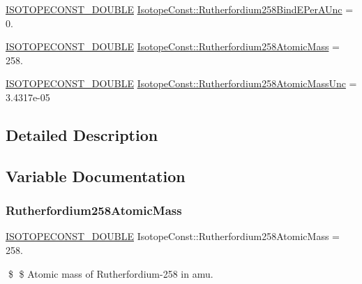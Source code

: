 \begin{DoxyCompactItemize}
\item 
\mbox{\hyperlink{group___isotope_const-_macros_ga8f45a7272ce02c0b4c65c44636ed719a}{I\+S\+O\+T\+O\+P\+E\+C\+O\+N\+S\+T\+\_\+\+D\+O\+U\+B\+LE}} \mbox{\hyperlink{group___isotope_const-_rutherfordium-_rf258_gafa8544391fc252509c95faf8fa7879a5}{Isotope\+Const\+::\+Rutherfordium258\+Bind\+E\+Per\+A\+Unc}} = 0.
\item 
\mbox{\hyperlink{group___isotope_const-_macros_ga8f45a7272ce02c0b4c65c44636ed719a}{I\+S\+O\+T\+O\+P\+E\+C\+O\+N\+S\+T\+\_\+\+D\+O\+U\+B\+LE}} \mbox{\hyperlink{group___isotope_const-_rutherfordium-_rf258_gaca988e2b358799b7a209b51872d2fa53}{Isotope\+Const\+::\+Rutherfordium258\+Atomic\+Mass}} = 258.
\item 
\mbox{\hyperlink{group___isotope_const-_macros_ga8f45a7272ce02c0b4c65c44636ed719a}{I\+S\+O\+T\+O\+P\+E\+C\+O\+N\+S\+T\+\_\+\+D\+O\+U\+B\+LE}} \mbox{\hyperlink{group___isotope_const-_rutherfordium-_rf258_ga99139597c20890b35a790b67d15501a8}{Isotope\+Const\+::\+Rutherfordium258\+Atomic\+Mass\+Unc}} = 3.\+4317e-\/05
\end{DoxyCompactItemize}


\subsection{Detailed Description}


\subsection{Variable Documentation}
\mbox{\label{group___isotope_const-_rutherfordium-_rf258_gaca988e2b358799b7a209b51872d2fa53}} 
\subsubsection{\texorpdfstring{Rutherfordium258\+Atomic\+Mass}{Rutherfordium258AtomicMass}}
{\footnotesize\ttfamily \mbox{\hyperlink{group___isotope_const-_macros_ga8f45a7272ce02c0b4c65c44636ed719a}{I\+S\+O\+T\+O\+P\+E\+C\+O\+N\+S\+T\+\_\+\+D\+O\+U\+B\+LE}} Isotope\+Const\+::\+Rutherfordium258\+Atomic\+Mass = 258.}

\$ \$ Atomic mass of Rutherfordium-\/258 in amu. \mbox{\label{group___isotope_const-_rutherfordium-_rf258_ga99139597c20890b35a790b67d15501a8}} 
